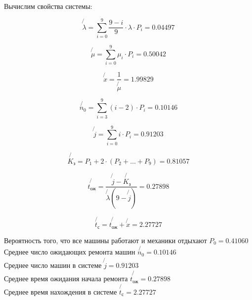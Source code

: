 Вычислим свойства системы:

\begin{equation*}
	\not{\lambda} = \sum_{i = 0}^9 \frac{9 - i}{9} \cdot \lambda \cdot P_i = 0.04497
\end{equation*}

\begin{equation*}
	\not{\mu} = \sum_{i = 0}^9 \mu_i \cdot P_i = 0.50042
\end{equation*}

\begin{equation*}
	\not{x} = \frac{1}{\not{\mu}} = 1.99829
\end{equation*}

\begin{equation*}
	\not{n_0} = \sum_{i = 3}^9 (i - 2) \cdot P_i = 0.10146
\end{equation*}

\begin{equation*}
	\not{j} = \sum_{i = 0}^9 i \cdot P_i = 0.91203
\end{equation*}

\begin{equation*}
	\not{K_\text{з}} = P_1 + 2 \cdot (P_2 + \dots + P_9) = 0.81057
\end{equation*}

\begin{equation*}
	\not{t_\text{ож}} = \frac{\not{j} - \not{K_\text{з}}}{\not{\lambda}(9 - \not{j})} = 0.27898
\end{equation*}

\begin{equation*}
	\not{t_\text{с}} = \not{t_\text{ож}} + \not{x} = 2.27727
\end{equation*}

\noindent Вероятность того, что все машины работают и механики отдыхают $P_0 = 0.41060$\\
Среднее число ожидающих ремонта машин $\not{n_0} = 0.10146$\\
Среднее число машин в системе $\not{j} = 0.91203$\\
Среднее время ожидания начала ремонта $\not{t_\text{ож}} = 0.27898$\\
Среднее время нахождения в системе $\not{t_\text{с}} = 2.27727$\\


